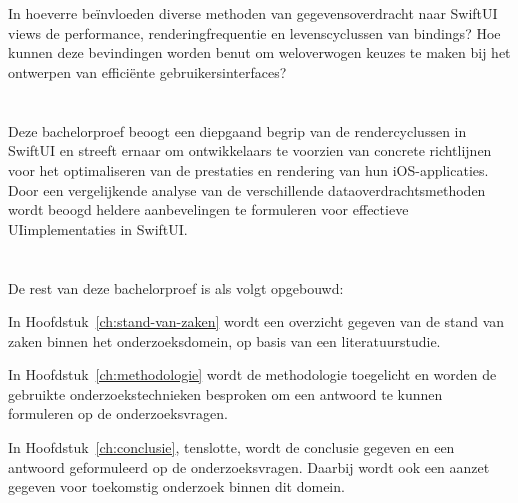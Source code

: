 \section{}%
\label{sec:onderzoeksvraag}
In hoeverre beïnvloeden diverse methoden van
gegevensoverdracht naar SwiftUI views de performance,
renderingfrequentie en levenscyclussen
van bindings? Hoe kunnen deze bevindingen
worden benut om weloverwogen keuzes te maken
bij het ontwerpen van efficiënte gebruikersinterfaces?

\section{}%
\label{sec:onderzoeksdoelstelling}


Deze bachelorproef beoogt een diepgaand begrip
van de rendercyclussen in SwiftUI en streeft
ernaar om ontwikkelaars te voorzien van concrete
richtlijnen voor het optimaliseren van de prestaties
en rendering van hun iOS-applicaties. Door
een vergelijkende analyse van de verschillende
dataoverdrachtsmethoden wordt beoogd heldere aanbevelingen te formuleren voor effectieve UIimplementaties
in SwiftUI.

\section{}%
\label{sec:opzet-bachelorproef}


De rest van deze bachelorproef is als volgt opgebouwd:

In Hoofdstuk~\ref{ch:stand-van-zaken} wordt een overzicht gegeven van de stand van zaken binnen het onderzoeksdomein, op basis van een literatuurstudie.

In Hoofdstuk~\ref{ch:methodologie} wordt de methodologie toegelicht en worden de gebruikte onderzoekstechnieken besproken om een antwoord te kunnen formuleren op de onderzoeksvragen.


In Hoofdstuk~\ref{ch:conclusie}, tenslotte, wordt de conclusie gegeven en een antwoord geformuleerd op de onderzoeksvragen. Daarbij wordt ook een aanzet gegeven voor toekomstig onderzoek binnen dit domein.